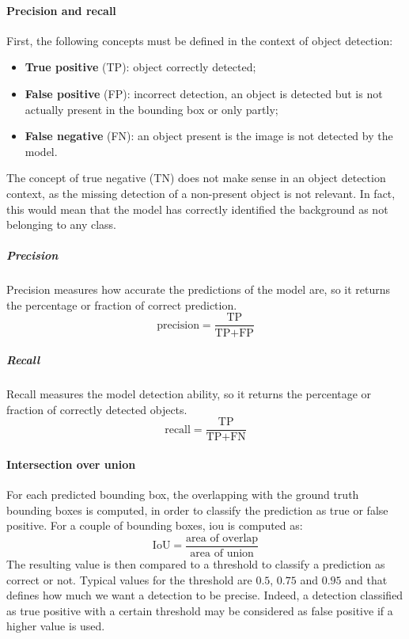 \documentclass[%
    corpo=12pt,
    twoside,
    stile=classica,   
    tipotesi=magistrale,
    evenboxes,
    english,
	numerazioneromana,
]{toptesi}
\begin{document}
\paragraph{Precision and recall}
First, the following concepts must be defined in the context of object detection:
\begin{itemize}
	\item \textbf{True positive} (TP): object correctly detected;
	\item \textbf{False positive} (FP): incorrect detection, an object is detected but is not actually present in the bounding box or only partly;
	\item \textbf{False negative} (FN): an object present is the image is not detected by the model.
\end{itemize}
The concept of true negative (TN) does not make sense in an object detection context, as the missing detection of a non-present object is not relevant. In fact, this would mean that the model has correctly identified the background as not belonging to any class.

\subparagraph{Precision}
Precision measures how accurate the predictions of the model are, so it returns the percentage or fraction of correct prediction.
\begin{equation}
	\text{precision} = \frac{\text{TP}}{\text{TP}+\text{FP}}
\end{equation}

\subparagraph{Recall}
Recall measures the model detection ability, so it returns the percentage or fraction of correctly detected objects.
\begin{equation}
	\text{recall} = \frac{\text{TP}}{\text{TP}+\text{FN}}
\end{equation}

\paragraph{Intersection over union}
For each predicted bounding box, the overlapping with the ground truth bounding boxes is computed, in order to classify the prediction as true or false positive. For a couple of bounding boxes, \gls{iou} is computed as:
\begin{equation}
	\text{IoU} = \frac{\text{area of overlap}}{\text{area of union}}
\end{equation}
The resulting value is then compared to a threshold to classify a prediction as correct or not. Typical values for the threshold are $0.5$, $0.75$ and $0.95$ and that defines how much we want a detection to be precise. Indeed, a detection classified as true positive with a certain threshold may be considered as false positive if a higher value is used.
\end{document}
